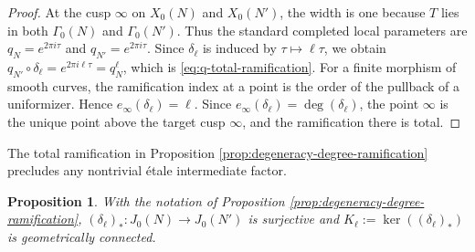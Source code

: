 \documentclass[12pt, letterpaper]{amsart}
\newtheorem{proposition}[theorem]{Proposition}
\theoremstyle{definition}
\theoremstyle{remark}
\numberwithin{equation}{section}
\begin{document}
\begin{proof}
At the cusp \(\infty\) on \(X_0(N)\) and \(X_0(N')\), the width is one because
\(T\) lies in both \(\Gamma_0(N)\) and \(\Gamma_0(N')\). Thus the standard
completed local parameters are \(q_N=e^{2\pi i\tau}\) and
\(q_{N'}=e^{2\pi i\tau}\). Since \(\delta_\ell\) is induced by
\(\tau\mapsto\ell\tau\), we obtain
\(q_{N'}\circ \delta_\ell=e^{2\pi i\ell\tau}=q_N^\ell\), which is
\eqref{eq:q-total-ramification}. For a finite morphism of smooth
curves, the ramification index at a point is the order of the pullback of a
uniformizer. Hence \(e_\infty(\delta_\ell)=\ell\). Since
\(e_\infty(\delta_\ell)=\deg(\delta_\ell)\), the point \(\infty\) is the unique
point above the target cusp \(\infty\), and the ramification there is total.
\end{proof}

The total ramification in Proposition
\ref{prop:degeneracy-degree-ramification} precludes any nontrivial \'etale
intermediate factor.

\begin{proposition}\label{prop:connected-degeneracy-kernel}
With the notation of Proposition
\ref{prop:degeneracy-degree-ramification},
\((\delta_\ell)_*:J_0(N)\to J_0(N')\) is surjective and
\(K_\ell:=\ker((\delta_\ell)_*)\) is geometrically
connected.
\end{proposition}
\end{document}
